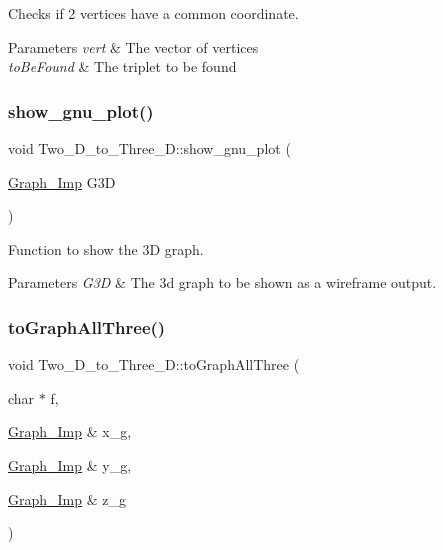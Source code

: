 Checks if 2 vertices have a common coordinate. 


\begin{DoxyParams}{Parameters}
{\em vert} & The vector of vertices \\
\hline
{\em to\+Be\+Found} & The triplet to be found \\
\hline
\end{DoxyParams}
\mbox{\label{class_two___d__to___three___d_a6e66e6c3bc964eeff83d126e10d807f1}} 
\subsubsection{\texorpdfstring{show\+\_\+gnu\+\_\+plot()}{show\_gnu\_plot()}}
{\footnotesize\ttfamily void Two\+\_\+\+D\+\_\+to\+\_\+\+Three\+\_\+\+D\+::show\+\_\+gnu\+\_\+plot (\begin{DoxyParamCaption}\item[{\mbox{\hyperlink{class_graph___imp}{Graph\+\_\+\+Imp}}}]{G3D }\end{DoxyParamCaption})}



Function to show the 3D graph. 


\begin{DoxyParams}{Parameters}
{\em G3D} & The 3d graph to be shown as a wireframe output. \\
\hline
\end{DoxyParams}
\mbox{\label{class_two___d__to___three___d_ac24543905f60e508c904e0bfaf80beb3}} 
\subsubsection{\texorpdfstring{to\+Graph\+All\+Three()}{toGraphAllThree()}}
{\footnotesize\ttfamily void Two\+\_\+\+D\+\_\+to\+\_\+\+Three\+\_\+\+D\+::to\+Graph\+All\+Three (\begin{DoxyParamCaption}\item[{char $\ast$}]{f,  }\item[{\mbox{\hyperlink{class_graph___imp}{Graph\+\_\+\+Imp}} \&}]{x\+\_\+g,  }\item[{\mbox{\hyperlink{class_graph___imp}{Graph\+\_\+\+Imp}} \&}]{y\+\_\+g,  }\item[{\mbox{\hyperlink{class_graph___imp}{Graph\+\_\+\+Imp}} \&}]{z\+\_\+g }\end{DoxyParamCaption})}



